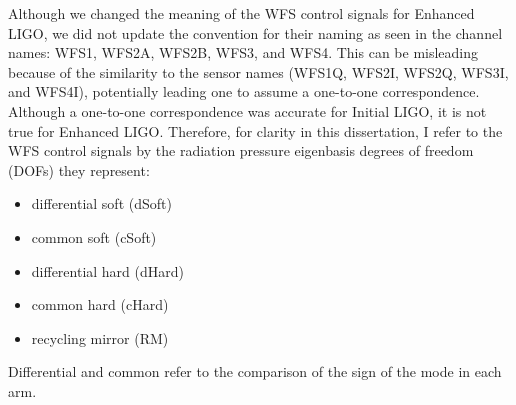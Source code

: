 Although we changed the meaning of the WFS control signals for
Enhanced LIGO, we did not update the convention for their naming as
seen in the channel names: WFS1, WFS2A, WFS2B, WFS3, and WFS4. This
can be misleading because of the similarity to the sensor names
(WFS1Q, WFS2I, WFS2Q, WFS3I, and WFS4I), potentially leading one to
assume a one-to-one correspondence. Although a one-to-one
correspondence was accurate for Initial LIGO, it is not true for
Enhanced LIGO. Therefore, for clarity in this dissertation, I refer to
the WFS control signals by the radiation pressure eigenbasis degrees
of freedom (DOFs) they represent:
\begin{itemize}
\item differential soft (dSoft) \vspace{-10 pt}\\
\item common soft (cSoft) \vspace{-10 pt}\\
\item differential hard (dHard) \vspace{-10 pt}\\
\item common hard (cHard) \vspace{-10 pt}\\
\item recycling mirror (RM)
\end{itemize}
Differential and common refer to the comparison of the sign of the mode in each arm.




